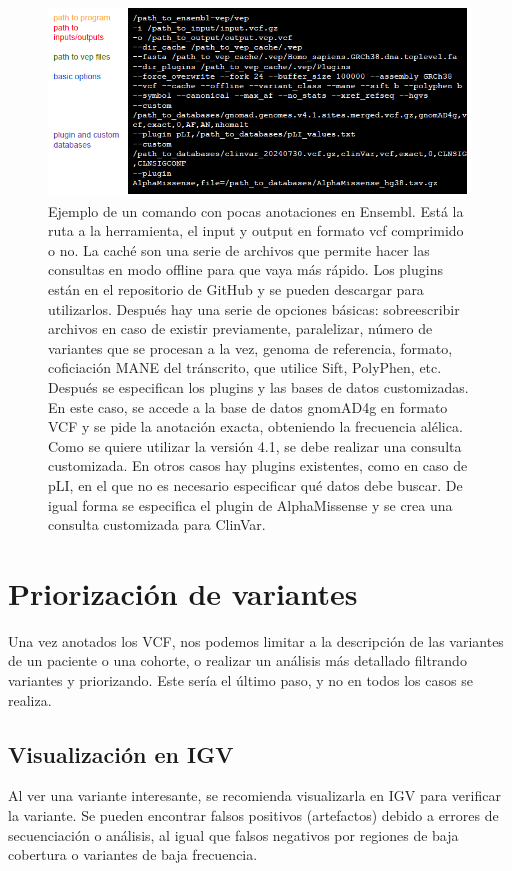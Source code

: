 \begin{figure}[htbp]
\centering
\includegraphics[width = \textwidth]{figs/ensembl-vep-commandline.png}
\caption{Ejemplo de un comando con pocas anotaciones en Ensembl. Está la ruta a la herramienta, el input y output en formato vcf comprimido o no. La caché son una serie de archivos que permite hacer las consultas en modo offline para que vaya más rápido. Los plugins están en el repositorio de GitHub y se pueden descargar para utilizarlos. Después hay una serie de opciones básicas: sobreescribir archivos en caso de existir previamente, paralelizar, número de variantes que se procesan a la vez, genoma de referencia, formato, coficiación MANE del tránscrito, que utilice Sift, PolyPhen, etc. Después se especifican los plugins y las bases de datos customizadas. En este caso, se accede a la base de datos gnomAD4g en formato VCF y se pide la anotación exacta, obteniendo la frecuencia alélica. Como se quiere utilizar la versión 4.1, se debe realizar una consulta customizada. En otros casos hay plugins existentes, como en caso de pLI, en el que no es necesario especificar qué datos debe buscar. De igual forma se especifica el plugin de AlphaMissense y se crea una consulta customizada para ClinVar.}
\end{figure}

\chapter{Priorización de variantes}
Una vez anotados los VCF, nos podemos limitar a la descripción de las variantes de un paciente o una cohorte, o realizar un análisis más detallado filtrando variantes y priorizando. Este sería el último paso, y no en todos los casos se realiza. 

\section{Visualización en IGV}
Al ver una variante interesante, se recomienda visualizarla en IGV para verificar la variante. Se pueden encontrar falsos positivos (artefactos) debido a errores de secuenciación o análisis, al igual que falsos negativos por regiones de baja cobertura o variantes de baja frecuencia. 

